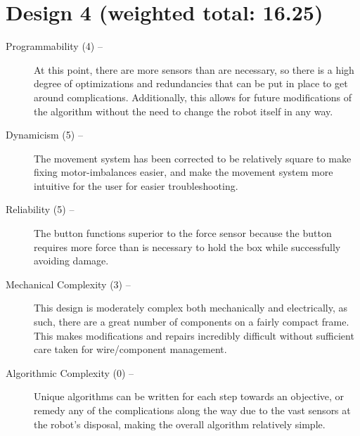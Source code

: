 \documentclass[11pt]{report}
\begin{document}
\section{Design 4 (weighted total: 16.25)}\label{matrixdesign4}
\begin{greylineformat}
\begin{description}
    \item[Programmability (4) --]At this point, there are more sensors than are necessary, so there is a high degree of optimizations and redundancies that can be put in place to get around complications. Additionally, this allows for future modifications of the algorithm without the need to change the robot itself in any way.
    \item[Dynamicism (5) --]The movement system has been corrected to be relatively square to make fixing motor-imbalances easier, and make the movement system more intuitive for the user for easier troubleshooting.
    \item[Reliability (5) --]The button functions superior to the force sensor because the button requires more force than is necessary to hold the box while successfully avoiding damage.
    \item[Mechanical Complexity (3) --]This design is moderately complex both mechanically and electrically, as such, there are a great number of components on a fairly compact frame. This makes modifications and repairs incredibly difficult without sufficient care taken for wire/component management.
    \item[Algorithmic Complexity (0) --]Unique algorithms can be written for each step towards an objective, or remedy any of the complications along the way due to the vast sensors at the robot's disposal, making the overall algorithm relatively simple.
\end{description}
\end{greylineformat}
\end{document}
